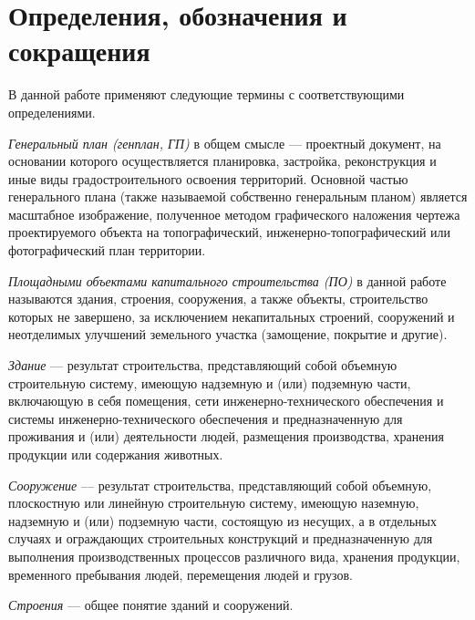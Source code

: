 \section*{\Large{Определения, обозначения и сокращения}}

В данной работе применяют следующие термины с соответствующими определениями.

\textit{Генеральный план (генплан, ГП)} в общем смысле —
проектный документ, на основании которого осуществляется планировка,
застройка, реконструкция и иные виды градостроительного освоения территорий.
Основной частью генерального плана (также называемой собственно генеральным планом)
является масштабное изображение, полученное методом графического наложения чертежа
проектируемого объекта на топографический,
инженерно-топографический или фотографический план территории.


\textit{Площадными объектами капитального строительства (ПО)} в данной работе называются
здания, строения, сооружения, а также объекты, строительство которых не завершено, за исключением некапитальных строений,
сооружений и неотделимых улучшений земельного участка (замощение, покрытие и другие)\cite{CapitalBuilding}.


\textit{Здание} — результат строительства, представляющий собой объемную строительную систему,
имеющую надземную и (или) подземную части, включающую в себя помещения,
сети инженерно-технического обеспечения и системы инженерно-технического обеспечения и предназначенную для проживания и
(или) деятельности людей, размещения производства, хранения продукции или содержания животных\cite{SafetyBuildings}.


\textit{Сооружение} — результат строительства,
представляющий собой объемную, плоскостную или линейную строительную систему,
имеющую наземную, надземную и (или) подземную части, состоящую из несущих,
а в отдельных случаях и ограждающих строительных конструкций и предназначенную для выполнения
производственных процессов различного вида, хранения продукции, временного пребывания людей,
перемещения людей и грузов\cite{SafetyBuildings}.


\textit{Строения} — общее понятие зданий и сооружений\cite{CivilCode}.


